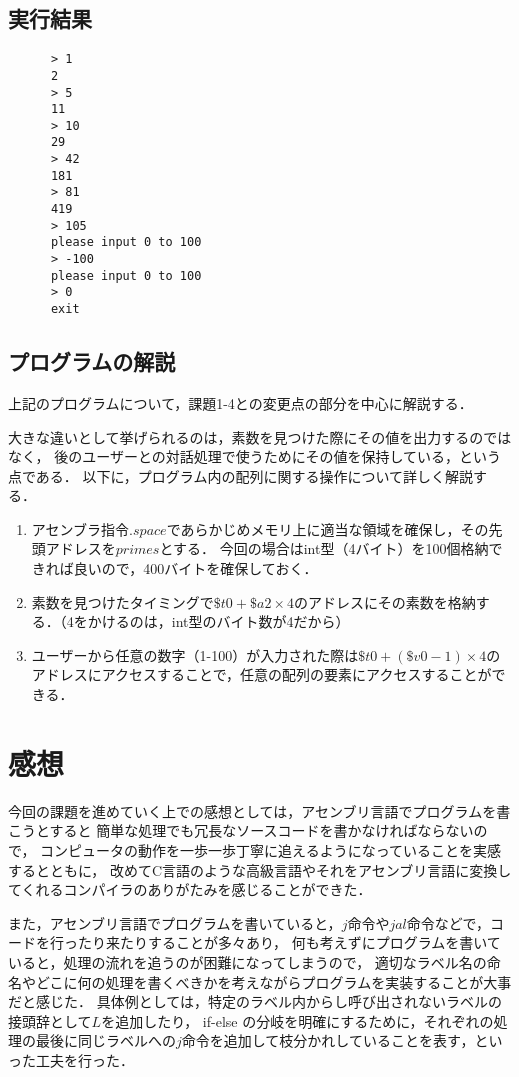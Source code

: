 \documentclass[a4j,11pt]{jarticle}
\begin{document}
\subsection{実行結果}

\begin{verbatim}
      > 1
      2
      > 5
      11
      > 10
      29
      > 42
      181
      > 81
      419
      > 105
      please input 0 to 100
      > -100
      please input 0 to 100
      > 0
      exit            
\end{verbatim}

\subsection{プログラムの解説}
上記のプログラムについて，課題1-4との変更点の部分を中心に解説する．

大きな違いとして挙げられるのは，素数を見つけた際にその値を出力するのではなく，
後のユーザーとの対話処理で使うためにその値を保持している，という点である．
以下に，プログラム内の配列に関する操作について詳しく解説する．

\begin{enumerate}
      \item アセンブラ指令$.space$であらかじめメモリ上に適当な領域を確保し，その先頭アドレスを$primes$とする．
      今回の場合はint型（4バイト）を100個格納できれば良いので，400バイトを確保しておく．
      \item 素数を見つけたタイミングで$\$t0 + \$a2 \times 4$のアドレスにその素数を格納する．（4をかけるのは，int型のバイト数が4だから）
      \item ユーザーから任意の数字（1-100）が入力された際は$\$t0 + (\$v0 - 1) \times 4$のアドレスにアクセスすることで，任意の配列の要素にアクセスすることができる．
\end{enumerate}


\section{感想}
今回の課題を進めていく上での感想としては，アセンブリ言語でプログラムを書こうとすると
簡単な処理でも冗長なソースコードを書かなければならないので，
コンピュータの動作を一歩一歩丁寧に追えるようになっていることを実感するとともに，
改めてC言語のような高級言語やそれをアセンブリ言語に変換してくれるコンパイラのありがたみを感じることができた．

また，アセンブリ言語でプログラムを書いていると，$j$命令や$jal$命令などで，コードを行ったり来たりすることが多々あり，
何も考えずにプログラムを書いていると，処理の流れを追うのが困難になってしまうので，
適切なラベル名の命名やどこに何の処理を書くべきかを考えながらプログラムを実装することが大事だと感じた．
具体例としては，特定のラベル内からし呼び出されないラベルの接頭辞として$L$を追加したり，
if-else の分岐を明確にするために，それぞれの処理の最後に同じラベルへの$j$命令を追加して枝分かれしていることを表す，といった工夫を行った．
\end{document}
